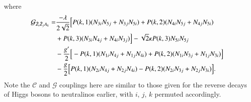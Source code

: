 \documentclass[final,3p,times]{elsarticle}
\begin{document}
where
\begin{equation}
\begin{aligned}
\mathcal{G}_{\tilde{Z}_i \tilde{Z}_j A_k} = & {-\lambda \over 2 \sqrt{2}}\Big[P(k,1)(N_{3i}N_{5j} + N_{3j}N_{5i}) + P(k,2)(N_{4i}N_{5j} + N_{4j}N_{5i}) \\ &  + P(k,3)(N_{3i}N_{4j} + N_{4i}N_{3j})\Big] - \sqrt{2} \kappa P(k,3) N_{5i}N_{5j} \\ &  - {g' \over 2}\Big[-P(k,1)(N_{1i}N_{4j} + N_{1j}N_{4i}) + P(k,2)(N_{1i}N_{3j} + N_{1j}N_{3i})\Big] \\ &  - {g \over 2}\Big[P(k,1)(N_{2i}N_{4j} + N_{2j}N_{4i}) - P(k,2)(N_{2i}N_{3j} + N_{2j}N_{3i})\Big].
\end{aligned}
\end{equation}
Note the $\mathcal{C}$ and $\mathcal{G}$ couplings here are similar to those
given for the reverse decays of Higgs bosons to neutralinos earlier, with
$i$, $j$, $k$ permuted accordingly. 
\end{document}
